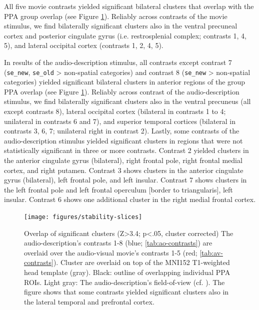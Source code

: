 \documentclass[english]{article}
\begin{document}
All five movie contrasts yielded significant bilateral clusters that
overlap with the PPA group overlap (see Figure \ref{fig:stability-slices}).
Reliably across contrasts of the movie stimulus, we find bilaterally
significant clusters also in the ventral precuneal cortex and posterior
cingulate gyrus (i.e. restrosplenial complex; contrasts 1, 4, 5), and lateral
occipital cortex (contrasts 1, 2, 4, 5).


In results of the audio-description stimulus, all contrasts except contrast 7
(\texttt{se\_new}, \texttt{se\_old} > non-spatial categories) and contrast 8
(\texttt{se\_new} > non-spatial categories) yielded significant bilateral
clusters in anterior regions of the group PPA overlap (see Figure
\ref{fig:stability-slices}).
Reliably across contrast of the audio-description stimulus, we find bilaterally significant
clusters also in the ventral precuneus (all except contrasts 8), lateral
occipital cortex (bilateral in contrasts 1 to 4; unilateral in contrasts 6 and
7), and superior temporal cortices (bilateral in contrasts 3, 6, 7; unilateral
right in contrast 2).
Lastly, some contrasts of the audio-description stimulus yielded significant clusters in
regions that were not statistically significant in three or more contrasts.
%
Contrast 2 yielded clusters in the anterior cingulate gyrus (bilateral), right
frontal pole, right frontal medial cortex, and right putamen.
%
Contrast 3 shows clusters in the anterior cingulate gyrus (bilateral), left
frontal pole, and left insular.
%
Contrast 7 shows clusters in the left frontal pole and left frontal operculum
[border to triangularis], left insular.
%
Contrast 6 shows one additional cluster in the right medial frontal cortex.


\begin{figure}[h!]
\centering
    \texttt{[image: figures/stability-slices]}
    \caption{Overlap of significant clusters (Z>3.4; p<.05, cluster corrected)
        The audio-description's contrasts 1-8 (blue; \ref{tab:ao-contrasts})
        are overlaid over the audio-visual movie's contrasts 1-5 (red;
        \ref{tab:av-contrasts}).
        Cluster are overlaid on top of the MNI152 T1-weighted head template
        (gray).
        Black: outline of overlapping individual PPA ROIs.
        Light gray: The audio-description's field-of-view (cf.
        \citep{hanke2014audiomovie}).
        The figure shows that some contrasts yielded significant clusters
        also in the lateral temporal and prefrontal cortex.
        }
    \label{fig:stability-slices}
\end{figure}
\end{document}
